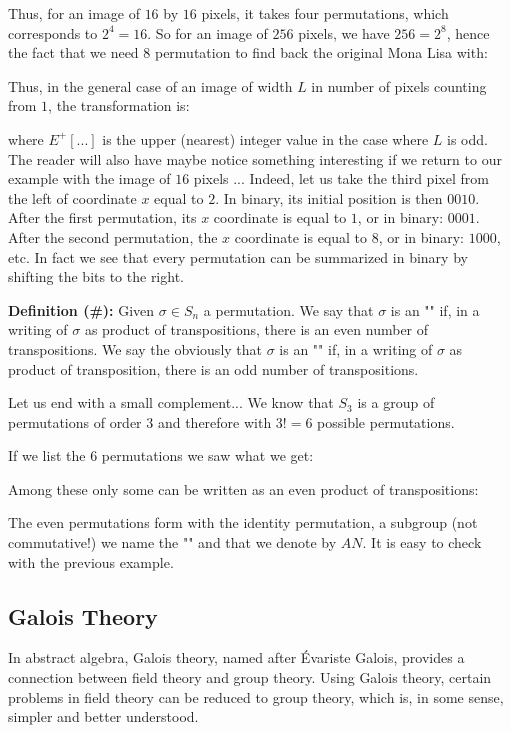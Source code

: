 	\pagebreak
	\begin{tcolorbox}[colframe=black,colback=white,sharp corners]
	
	Thus, for an image of $16$ by $16$ pixels, it takes four permutations, which corresponds to $2^4=16$. So for an image of $256$ pixels, we have $256=2^8$, hence the fact that we need $8$ permutation to find back the original Mona Lisa with:
	
	Thus, in the general case of an image of width $L$ in number of pixels counting from $1$, the transformation is:
	
	where $E^+[...]$ is the upper (nearest) integer value in the case where $L$ is odd.\\
	
	The reader will also have maybe notice something interesting if we return to our example with the image of $16$ pixels ... Indeed, let us take the third pixel from the left of coordinate $x$ equal to $2$. In binary, its initial position is then $0010$. After the first permutation, its $x$ coordinate is equal to $1$, or in binary: $0001$. After the second permutation, the $x$ coordinate is equal to $8$, or in binary: $1000$, etc. In fact we see that every permutation can be summarized in binary by shifting the bits to the right.
	\end{tcolorbox}
	\textbf{Definition (\#\mydef):} Given $\sigma \in S_n$ a permutation. We say that $\sigma$ is an "" if, in a writing of $\sigma$ as product of transpositions, there is an even number of transpositions. We say the obviously that $\sigma$ is an "" if, in a writing of $\sigma$ as product of transposition, there is an odd number of transpositions.
	
	Let us end with a small complement... We know that $S_3$ is a group of permutations of order $3$ and therefore with $3!=6$ possible permutations.
	
	If we list the $6$ permutations we saw what we get:
	
	Among these only some can be written as an even product of transpositions:
	
	The even permutations form with the identity permutation, a subgroup (not commutative!) we name the "" and that we denote by $AN$. It is easy to check with the previous example.
		
	\subsection{Galois Theory}\label{galois theory}
	In abstract algebra, Galois theory, named after Évariste Galois, provides a connection between field theory and group theory. Using Galois theory, certain problems in field theory can be reduced to group theory, which is, in some sense, simpler and better understood.
	
